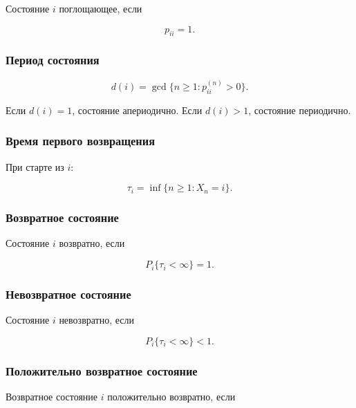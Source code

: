 \documentclass[
  11pt,
  a4paper,
]{article}
\begin{document}
Состояние \(i\) поглощающее, если

\[
p_{ii}=1.
\]

\subsubsection{Период
состояния}\label{ux43fux435ux440ux438ux43eux434-ux441ux43eux441ux442ux43eux44fux43dux438ux44f}

\[
d(i)=\gcd\{n\ge1:p_{ii}^{(n)}>0\}.
\]

Если \(d(i)=1\), состояние апериодично. Если \(d(i)>1\), состояние
периодично.

\subsubsection{Время первого
возвращения}\label{ux432ux440ux435ux43cux44f-ux43fux435ux440ux432ux43eux433ux43e-ux432ux43eux437ux432ux440ux430ux449ux435ux43dux438ux44f}

При старте из \(i\):

\[
\tau_i=\inf\{n\ge1:X_n=i\}.
\]

\subsubsection{Возвратное
состояние}\label{ux432ux43eux437ux432ux440ux430ux442ux43dux43eux435-ux441ux43eux441ux442ux43eux44fux43dux438ux435}

Состояние \(i\) возвратно, если

\[
P_i\{\tau_i<\infty\}=1.
\]

\subsubsection{Невозвратное
состояние}\label{ux43dux435ux432ux43eux437ux432ux440ux430ux442ux43dux43eux435-ux441ux43eux441ux442ux43eux44fux43dux438ux435}

Состояние \(i\) невозвратно, если

\[
P_i\{\tau_i<\infty\}<1.
\]

\subsubsection{Положительно возвратное
состояние}\label{ux43fux43eux43bux43eux436ux438ux442ux435ux43bux44cux43dux43e-ux432ux43eux437ux432ux440ux430ux442ux43dux43eux435-ux441ux43eux441ux442ux43eux44fux43dux438ux435}

Возвратное состояние \(i\) положительно возвратно, если
\end{document}
